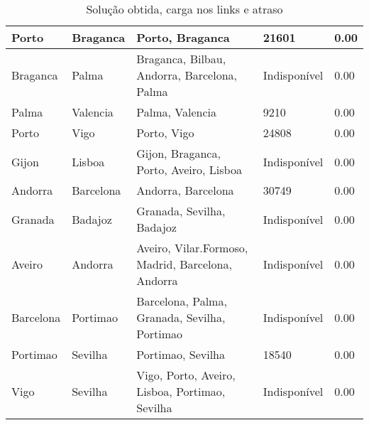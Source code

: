 \begin{table}[!htb]
{\begin{tabular}{|l|l|l|l|l|}
Porto & Braganca & Porto, Braganca & 21601 & 0.00 \\ \hline
Braganca & Palma & Braganca, Bilbau, Andorra, Barcelona, Palma & Indisponível & 0.00 \\ \hline
Palma & Valencia & Palma, Valencia & 9210 & 0.00 \\ \hline
Porto & Vigo & Porto, Vigo & 24808 & 0.00 \\ \hline
Gijon & Lisboa & Gijon, Braganca, Porto, Aveiro, Lisboa & Indisponível & 0.00 \\ \hline
Andorra & Barcelona & Andorra, Barcelona & 30749 & 0.00 \\ \hline
Granada & Badajoz & Granada, Sevilha, Badajoz & Indisponível & 0.00 \\ \hline
Aveiro & Andorra & Aveiro, Vilar.Formoso, Madrid, Barcelona, Andorra & Indisponível & 0.00 \\ \hline
Barcelona & Portimao & Barcelona, Palma, Granada, Sevilha, Portimao & Indisponível & 0.00 \\ \hline
Portimao & Sevilha & Portimao, Sevilha & 18540 & 0.00 \\ \hline
Vigo & Sevilha & Vigo, Porto, Aveiro, Lisboa, Portimao, Sevilha & Indisponível & 0.00 \\ \hline
\end{tabular}}
\caption[]{Solução obtida, carga nos links e atraso}
\end{table}

